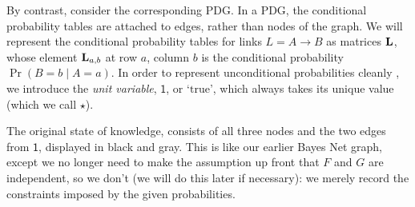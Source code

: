 \documentclass{article}
\newcommand{\MN}{PDG}%
\begin{document}
\begin{example}
		By contrast, consider the corresponding \MN.
		In a \MN, the conditional probability tables are attached to edges, rather than nodes of the graph. 
		We will represent the conditional probability tables for links $L = A\to B$ as matrices $\mathbf L$, whose element $\mathbf L_{a,b}$ at row $a$, column $b$ is the conditional probability $\Pr(B = b \mid A = a)$. 		
		In order to represent unconditional probabilities cleanly%
		, we introduce the \emph{unit variable}, $\mathsf 1$, or `$\mathrm{true}$', which always takes its unique value (which we call $\star$). 
		
		\begin{center}
		\end{center}
		
		The original state of knowledge, consists of all three nodes and the two edges from $\mathsf 1$, displayed in black and gray. This is like our earlier Bayes Net graph, except we no longer need to make the assumption up front that $F$ and $G$ are independent, so we don't (we will do this later if necessary): we merely record the constraints imposed by the given probabilities.
		

\end{example}
\end{document}
